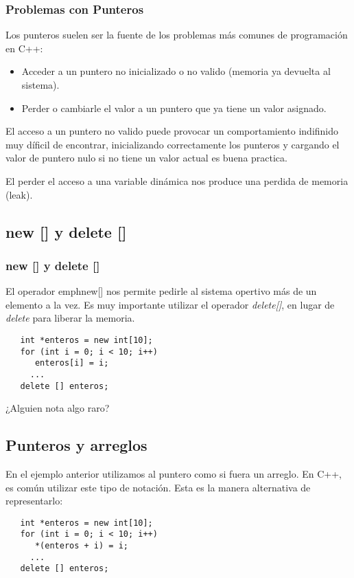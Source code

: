 \documentclass{beamer}
\begin{document}
\begin{frame}[fragile]
\frametitle{Problemas con Punteros}
Los punteros suelen ser la fuente de los problemas más comunes de programación en C++:

\begin{itemize}
 \item Acceder a un puntero no inicializado o no valido (memoria ya devuelta al sistema).
 \item Perder o cambiarle el valor a un puntero que ya tiene un valor asignado.
\end{itemize}

El acceso a un puntero no valido puede provocar un comportamiento indifinido muy díficil de encontrar, inicializando correctamente los punteros y cargando el valor de puntero nulo si no tiene un valor actual es buena practica.

El perder el acceso a una variable dinámica nos produce una perdida de memoria (leak).

\end{frame}

\subsection{new [] y delete []}
\begin{frame}[fragile]
\frametitle{new [] y delete []}

El operador emph{new[]} nos permite pedirle al sistema opertivo más de un elemento a la vez.
Es muy importante utilizar el operador \emph{delete[]}, en lugar de \emph{delete} para liberar la memoria.
\begin{verbatim}
   int *enteros = new int[10];
   for (int i = 0; i < 10; i++)
      enteros[i] = i;
     ...
   delete [] enteros;
\end{verbatim}

¿Alguien nota algo raro?
\end{frame}

\subsection{Punteros y arreglos}
\begin{frame}[fragile]
En el ejemplo anterior utilizamos al puntero como si fuera un arreglo.
En C++, es común utilizar este tipo de notación.
Esta es la manera alternativa de representarlo:
\begin{verbatim}
   int *enteros = new int[10];
   for (int i = 0; i < 10; i++)
      *(enteros + i) = i;
     ...
   delete [] enteros;
 
\end{verbatim}

\end{frame}
\end{document}
